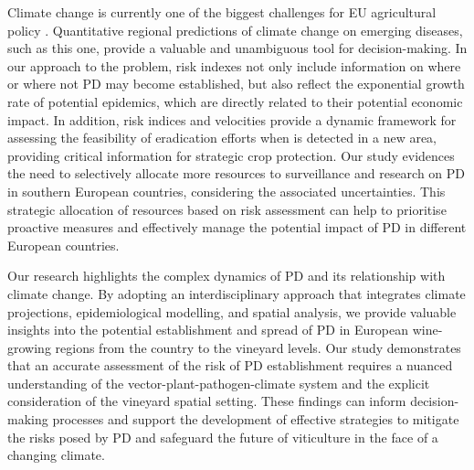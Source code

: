 Climate change is currently one of the biggest challenges for EU
agricultural policy \cite{fellmann2018major}. Quantitative regional predictions
of climate change on emerging diseases, such as this one, provide a valuable
and unambiguous tool for decision-making. In our approach to the problem, risk
indexes not only include information on where or where not PD may become
established, but also reflect the exponential growth rate of potential
epidemics, which are directly related to their potential economic impact. In
addition, risk indices and velocities provide a dynamic framework for assessing
the feasibility of eradication efforts when \xf{} is detected in a new area,
providing critical information for strategic crop protection. Our study
evidences the need to selectively allocate more resources to surveillance and
research on PD in southern European countries, considering the associated
uncertainties. This strategic allocation of resources based on risk assessment
can help to prioritise proactive measures and effectively manage the potential
impact of PD in different European countries.

Our research highlights the complex dynamics of PD and its relationship
with climate change. By adopting an interdisciplinary approach that integrates
climate projections, epidemiological modelling, and spatial analysis, we
provide valuable insights into the potential establishment and spread of PD in
European wine-growing regions from the country to the vineyard levels. Our
study demonstrates that an accurate assessment of the risk of PD establishment
requires a nuanced understanding of the vector-plant-pathogen-climate system
and the explicit consideration of the vineyard spatial setting. These findings
can inform decision-making processes and support the development of effective
strategies to mitigate the risks posed by PD and safeguard the future of
viticulture in the face of a changing climate.
